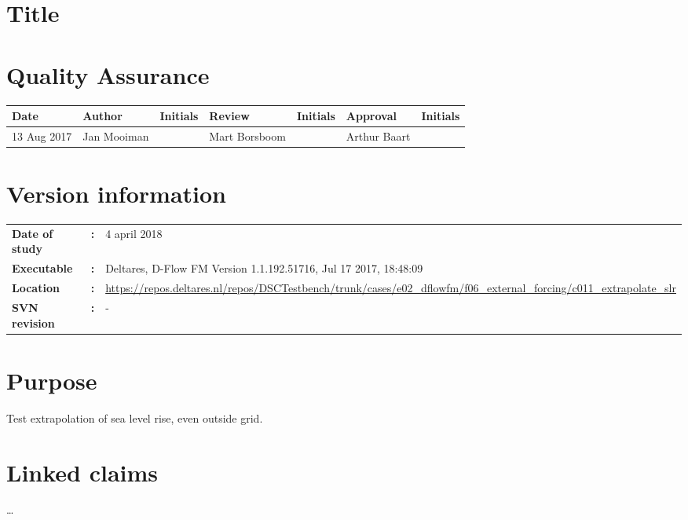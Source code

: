 \section{Title}
\newrefsegment

\section*{Quality Assurance}
{{\footnotesize
\begin{tabular}{p{22mm-2pt}@{}p{27mm-2pt}@{}p{18mm}@{}p{27mm-2pt}@{}p{18mm}@{}p{27mm-2pt}@{}p{\textwidth-139mm-1pt}} \hline
    \rowcolor{dgrey4}
\textbf{Date} & \textbf{Author} & \textbf{Initials} & \textbf{Review} & \textbf{Initials} & \textbf{Approval} & \textbf{Initials}  \\ \hline
13 Aug 2017 & Jan Mooiman & & Mart Borsboom & & Arthur Baart &   \\ \hline
  \end{tabular}
}}

\section*{Version information}
\begin{tabular}{@{}p{23mm}@{}p{0mm}p{\textwidth-23mm-30pt}}
\textbf{Date of study}& \textbf{:} & 4 april 2018 \\
\textbf{Executable}   & \textbf{:} & Deltares, D-Flow FM Version 1.1.192.51716, Jul 17 2017, 18:48:09 \\
\textbf{Location}     & \textbf{:} & \url{https://repos.deltares.nl/repos/DSCTestbench/trunk/cases/e02_dflowfm/f06_external_forcing/c011_extrapolate_slr} \\ 
\textbf{SVN revision} & \textbf{:} & -
\end{tabular}

\section*{Purpose}

Test extrapolation of sea level rise, even outside grid.

\section*{Linked claims}
\ldots

